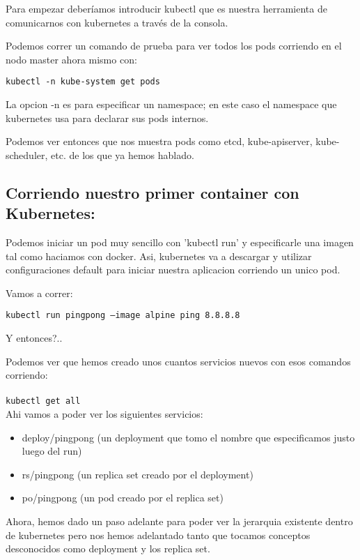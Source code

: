 \documentclass[11pt]{article} %
\begin{document}
Para empezar deberíamos introducir kubectl que es nuestra herramienta de comunicarnos con kubernetes a través de la consola.

Podemos correr un comando de prueba para ver todos los pods corriendo en el nodo master ahora mismo con:
\begin{center}
    \texttt{kubectl -n kube-system get pods}
\end{center}

La opcion -n es para especificar un namespace; en este caso el namespace que kubernetes usa para declarar sus pods internos.

Podemos ver entonces que nos muestra pods como etcd, kube-apiserver, kube-scheduler, etc. de los que ya hemos hablado.

\subsection{Corriendo nuestro primer container con Kubernetes:}

Podemos iniciar un pod muy sencillo con 'kubectl run' y especificarle una imagen tal como haciamos con docker. Asi, kubernetes va a descargar y utilizar configuraciones default para iniciar nuestra aplicacion corriendo un unico pod.

Vamos a correr:
\begin{center}
    \texttt{kubectl run pingpong --image alpine ping 8.8.8.8}
\end{center}

Y entonces?.. 

Podemos ver que hemos creado unos cuantos servicios nuevos con esos comandos corriendo:\\ \\
    \texttt{kubectl get all} \\

Ahi vamos a poder ver los siguientes servicios:
\begin{itemize}

	\item
	deploy/pingpong (un deployment que tomo el nombre que especificamos justo luego del run)
    
    \item
    rs/pingpong (un replica set creado por el deployment)
    
    \item
    po/pingpong (un pod creado por el replica set)
\end{itemize}

Ahora, hemos dado un paso adelante para poder ver la jerarquia existente dentro de kubernetes pero nos hemos adelantado tanto que tocamos conceptos desconocidos como deployment y los replica set.
\end{document}
